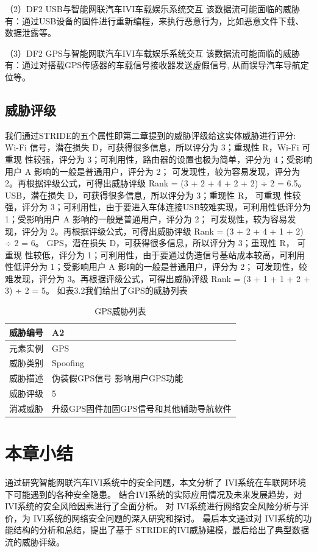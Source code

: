 （2）DF2 USB与智能网联汽车IVI车载娱乐系统交互
该数据流可能面临的威胁有：通过USB设备的固件进行重新编程，来执行恶意行为，比如恶意文件下载、数据泄露等\cite{nissim2017usb}。

（3）DF2 GPS与智能网联汽车IVI车载娱乐系统交互
该数据流可能面临的威胁有：通过对搭载GPS传感器的车载信号接收器发送虚假信号, 从而误导汽车导航定位等\cite{alamleh2020cheat}。
\subsection{威胁评级}
我们通过STRIDE的五个属性即第二章提到的威胁评级给这实体威胁进行评分:
Wi-Fi 信号，潜在损失 D，可获得很多信息，所以评分为 3；重现性 R，Wi-Fi 可重现
性较强，评分为 3；可利用性，路由器的设置也极为简单，评分为 4；受影响用户 A 影响的一般是普通用户，评分为 2；
可发现性，较为容易发现，评分为 2。再根据评级公式，可得出威胁评级 Rank = (3 + 2 + 4 + 2 + 2) ÷ 2 = 6.5。
USB，潜在损失 D，可获得很多信息，所以评分为 3；重现性 R， 可重现
性较强，评分为 3；可利用性，由于要进入车体连接USB较难实现，可利用性低评分为 1；受影响用户 A 影响的一般是普通用户，评分为 2；
可发现性，较为容易发现，评分为 2。再根据评级公式，可得出威胁评级 Rank = (3 + 2 + 4 + 1 + 2) ÷ 2 = 6。
GPS，潜在损失 D，可获得很多信息，所以评分为 3；重现性 R， 可重现
性较低，评分为 1；可利用性，由于要通过伪造信号基站成本较高，可利用性低评分为 1；受影响用户 A 影响的一般是普通用户，评分为 2；
可发现性，较难发现，评分为 3。再根据评级公式，可得出威胁评级 Rank = (3 + 1 + 1 + 2 + 3) ÷ 2 = 5。
如表3.2我们给出了GPS的威胁列表
\begin{table}
  \caption{GPS威胁列表}
\begin{center}
    \begin{tabular}{|l|l}
      \hline 威胁编号 & A2 \\
      \hline 元素实例 & GPS \\
      \hline 威胁类别 & Spoofing \\
      \hline 威胁描述 & 伪装假GPS信号 影响用户GPS功能 \\
      \hline 威胁评级 & 5 \\
      \hline 消减威胁 & 升级GPS固件加固GPS信号和其他辅助导航软件 \\
      \hline
      \end{tabular}
  \end{center}
\end{table}


\section{本章小结}
通过研究智能网联汽车IVI系统中的安全问题，本文分析了 IVI系统在车联网环境下可能遇到的各种安全隐患。
结合IVI系统的实际应用情况及未来发展趋势，对 IVI系统的安全风险因素进行了全面分析。
对 IVI系统进行网络安全风险分析与评价，为 IVI系统的网络安全问题的深入研究和探讨。
最后本文通过对 IVI系统的功能结构的分析和总结，提出了基于 STRIDE的IVI威胁建模，最后给出了典型数据流的威胁评级。
